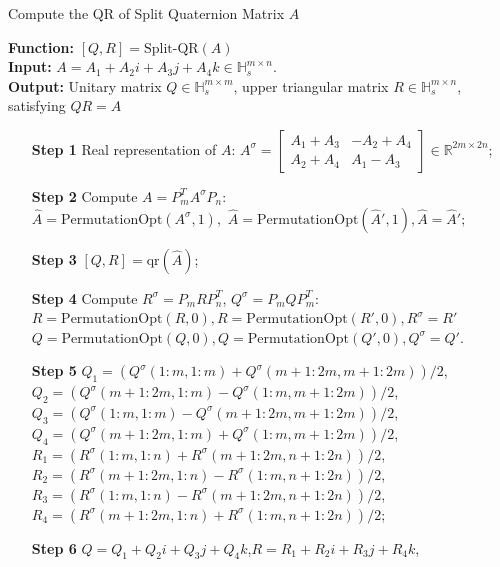 \documentclass[12pt]{article}
\numberwithin{equation}{section} %
\begin{document}
\linespread{1.1}
\begin{algorithm}[htbp] 
        \caption{Compute the QR of Split Quaternion Matrix \(A\)}
        \label{alg:QR}
        \textbf{Function:} $[Q, R]=\text{Split-QR}(A)$\\
        \textbf{Input:} \(A = A_1 + A_2 i + A_3 j + A_4 k \in \mathbb{H}_s^{m\times n}\). \\
        {\textbf{Output:}  }  Unitary matrix \(Q \in \mathbb{H}_s^{m\times m}\), upper triangular matrix \(R \in \mathbb{H}_s^{m\times n}\), satisfying \(Q  R = A\) 
    \begin{itemize}
        \item[\textbf{Step 1}] Real representation of $A$: \(A^\sigma = \begin{bmatrix}
            A_1 + A_3 & -A_2 + A_4 \\ A_2 + A_4 & A_1 - A_3
            \end{bmatrix} \in \mathbb{R}^{2m\times 2n}\);
         \item[\textbf{Step 2}] Compute \(A = P_{m}^T A^\sigma P_{n}\): \\$\hat{A}=\text{PermutationOpt}(A^\sigma,1),$ $\hat{A}=\text{PermutationOpt}(\hat{A}',1),\hat{A}=\hat{A}';$
        \item[\textbf{Step 3}] \([Q,R] = \text{qr}(\hat{A})\);
        \item[\textbf{Step 4}] Compute \(R^\sigma = P_{m}RP_{n}^T\), \(Q^\sigma = P_{m}QP_{m}^T\):\\
        $R=\text{PermutationOpt}(R,0),R=\text{PermutationOpt}(R',0),R^\sigma=R'$\\
        $Q=\text{PermutationOpt}(Q,0),Q=\text{PermutationOpt}(Q',0),Q^\sigma=Q'.$
        \item[\textbf{Step 5}] \(Q_1 = (Q^\sigma(1:m,1:m) + Q^\sigma(m+1:2m,m+1:2m))/2\),
           \(Q_2 = (Q^\sigma(m+1:2m,1:m) - Q^\sigma(1:m,m+1:2m))/2\),
            \(Q_3 = (Q^\sigma(1:m,1:m) - Q^\sigma(m+1:2m,m+1:2m))/2\),
            \(Q_4 = (Q^\sigma(m+1:2m,1:m) + Q^\sigma(1:m,m+1:2m))/2\),
            \(R_1 = (R^\sigma(1:m,1:n) + R^\sigma(m+1:2m,n+1:2n))/2\),
            \(R_2 = (R^\sigma(m+1:2m,1:n) - R^\sigma(1:m,n+1:2n))/2\),
            \(R_3 = (R^\sigma(1:m,1:n) - R^\sigma(m+1:2m,n+1:2n))/2\),
            \(R_4 = (R^\sigma(m+1:2m,1:n) + R^\sigma(1:m,n+1:2n))/2\);
        \item[\textbf{Step 6}] \(Q = Q_1 + Q_2i + Q_3j + Q_4k\),\quad\(R = R_1 + R_2i + R_3j + R_4k\),
        \end{itemize}
\end{algorithm}
\end{document}
